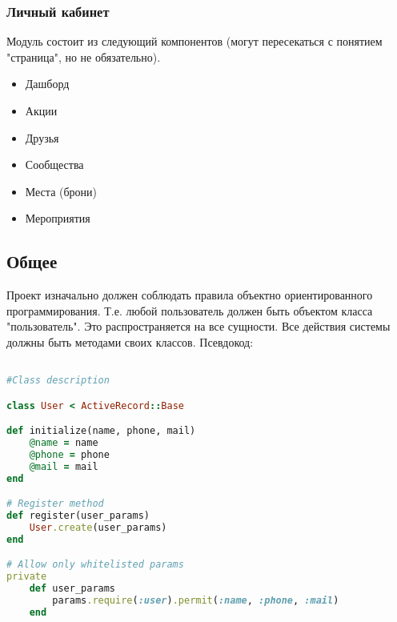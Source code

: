 \documentclass[DIV=calc, paper=a4, fontsize=11pt]{scrartcl} %
\begin{document}
\subsubsection{Личный кабинет}

Модуль состоит из следующий компонентов (могут пересекаться с понятием "страница", но не обязательно).

\begin{itemize}
	\item Дашборд
	\item Акции
	\item Друзья
	\item Сообщества
	\item Места (брони)
	\item Мероприятия
\end{itemize}


\subsection{Общее}

Проект изначально должен соблюдать правила объектно ориентированного программирования. Т.е. любой пользователь должен быть объектом класса "пользователь". Это распространяется на все сущности. Все действия системы должны быть методами своих классов. Псевдокод:
\begin{lstlisting}[language=Ruby]

#Class description

class User < ActiveRecord::Base 

def initialize(name, phone, mail)
	@name = name
	@phone = phone
	@mail = mail
end

# Register method
def register(user_params)
	User.create(user_params)
end

# Allow only whitelisted params
private
	def user_params
		params.require(:user).permit(:name, :phone, :mail)
	end
\end{lstlisting}
\end{document}
